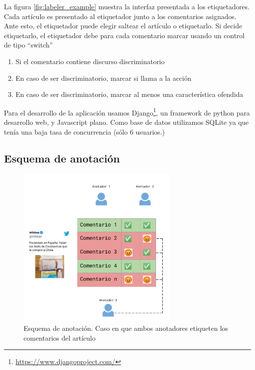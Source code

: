 La figura \ref{fig:labeler_example} muestra la interfaz presentada a los etiquetadores. Cada artículo es presentado al etiquetador junto a los comentarios asignados. Ante esto, el etiquetador puede elegir saltear el artículo o etiquetarlo. Si decide etiquetarlo, el etiquetador debe para cada comentario marcar usando un control de tipo ``switch''

\begin{enumerate}
    \item Si el comentario contiene discurso discriminatorio
    \item En caso de ser discriminatorio, marcar si llama a la acción
    \item En caso de ser discriminatorio, marcar al menos una característica ofendida
\end{enumerate}

Para el desarrollo de la aplicación usamos Django\footnote{\url{https://www.djangoproject.com/}}, un framework de python para desarrollo web, y Javascript plano. Como base de datos utilizamos SQLite ya que tenía una baja tasa de concurrencia (sólo 6 usuarios.)

\subsection{Esquema de anotación}



\begin{figure}
    \centering
    \includegraphics[width=0.7\textwidth]{img/esquema_anotacion.pdf}
    \caption{Esquema de anotación. Caso en que ambos anotadores etiqueten los comentarios del artículo}
    \label{fig:annotation_schema}
\end{figure}

